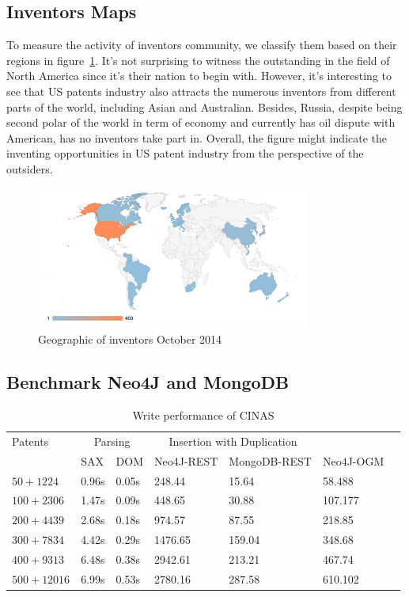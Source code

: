\documentclass{article}
\begin{document}
\subsection{Inventors Maps}
To measure the activity of inventors community, we classify them based on their regions in figure~\ref{fig:map}. It's not surprising to witness the outstanding in the field of North America since it's their nation to begin with. However, it's interesting to see that US patents industry also attracts the numerous inventors from different parts of the world, including Asian and Australian. Besides, Russia, despite being second polar of the world in term of economy and currently has oil dispute with American, has no inventors take part in. Overall, the figure might indicate the inventing opportunities in US patent industry from the perspective of the outsiders.
 \begin{figure}[H]
\centering
\includegraphics[width=90mm]{inventor-map.png}
\caption{ Geographic of inventors October 2014 }\label{fig:map}
\end{figure}

 \subsection{Benchmark Neo4J and MongoDB}
 \begin{table}[H]
 \centering

\begin{tabular}{lllllll}
\toprule 
    Patents & \multicolumn{2}{c}{Parsing} &\multicolumn{2}{c}{Insertion with Duplication}\\

    & SAX & DOM 
    & Neo4J-REST & MongoDB-REST & Neo4J-OGM\\
    \midrule
    $50 + 1224$     & 0.96s & 0.05s  &248.44 & 15.64 & 58.488 \\
    $100 + 2306$  & 1.47s & 0.09s &448.65 & 30.88 & 107.177\\
    $200 + 4439$  & 2.68s & 0.18s&974.57 & 87.55 & 218.85\\
    $300 + 7834$  & 4.42s& 0.29s&1476.65 & 159.04 & 348.68\\
    $400 + 9313$  & 6.48s & 0.38s&2942.61 & 213.21 & 467.74\\
    $500 + 12016$  & 6.99s& 0.53s &2780.16 & 287.58 & 610.102\\
    \bottomrule
\end{tabular}
\caption{Write performance of CINAS}
\end{table}
\end{document}
